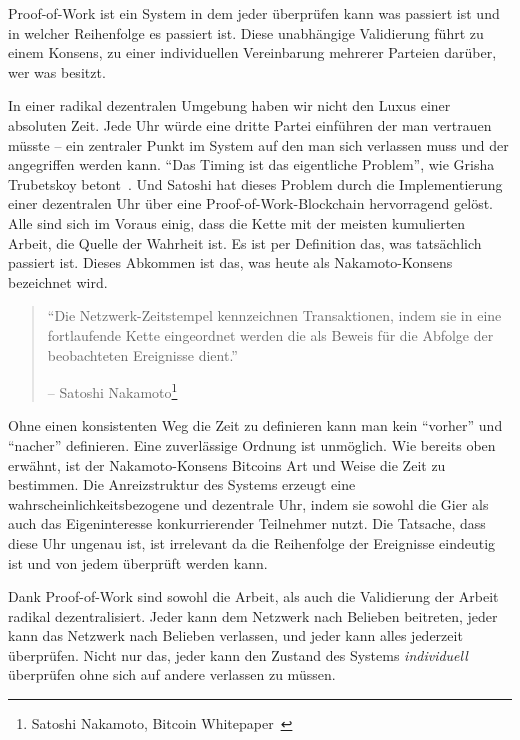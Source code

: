 Proof-of-Work ist ein System in dem jeder überprüfen kann was passiert ist und
in welcher Reihenfolge es passiert ist. Diese unabhängige Validierung führt zu
einem Konsens, zu einer individuellen Vereinbarung mehrerer Parteien darüber,
wer was besitzt.

In einer radikal dezentralen Umgebung haben wir nicht den Luxus einer absoluten
Zeit. Jede Uhr würde eine dritte Partei einführen der man vertrauen müsste --
ein zentraler Punkt im System auf den man sich verlassen muss und der
angegriffen werden kann. \enquote{Das Timing ist das eigentliche Problem}, wie
Grisha Trubetskoy betont~\cite{pow-clock}. Und Satoshi hat dieses Problem durch
die Implementierung einer dezentralen Uhr über eine Proof-of-Work-Blockchain
hervorragend gelöst. Alle sind sich im Voraus einig, dass die Kette mit der
meisten kumulierten Arbeit, die Quelle der Wahrheit ist. Es ist per Definition
das, was tatsächlich passiert ist. Dieses Abkommen ist das, was heute als
Nakamoto-Konsens bezeichnet wird.

\begin{quotation}\begin{samepage}
\enquote{Die Netzwerk-Zeitstempel kennzeichnen Transaktionen, indem sie in eine
fortlaufende Kette eingeordnet werden die als Beweis für die Abfolge der
beobachteten Ereignisse dient.}
\begin{flushright} -- Satoshi Nakamoto\footnote{Satoshi Nakamoto, Bitcoin Whitepaper~\cite{whitepaper}}
\end{flushright}\end{samepage}\end{quotation}

Ohne einen konsistenten Weg die Zeit zu definieren kann man kein
\enquote{vorher} und \enquote{nacher} definieren. Eine zuverlässige Ordnung ist
unmöglich. Wie bereits oben erwähnt, ist der Nakamoto-Konsens Bitcoins Art und
Weise die Zeit zu bestimmen. Die Anreizstruktur des Systems erzeugt eine
wahrscheinlichkeitsbezogene und dezentrale Uhr, indem sie sowohl die Gier als
auch das Eigeninteresse konkurrierender Teilnehmer nutzt. Die Tatsache, dass
diese Uhr ungenau ist, ist irrelevant da die Reihenfolge der Ereignisse
eindeutig ist und von jedem überprüft werden kann.

Dank Proof-of-Work sind sowohl die Arbeit, als auch die Validierung der
Arbeit radikal dezentralisiert. Jeder kann dem Netzwerk nach Belieben beitreten,
jeder kann das Netzwerk nach Belieben verlassen, und jeder kann alles jederzeit
überprüfen. Nicht nur das, jeder kann den Zustand des Systems
\textit{individuell} überprüfen ohne sich auf andere verlassen zu müssen.

